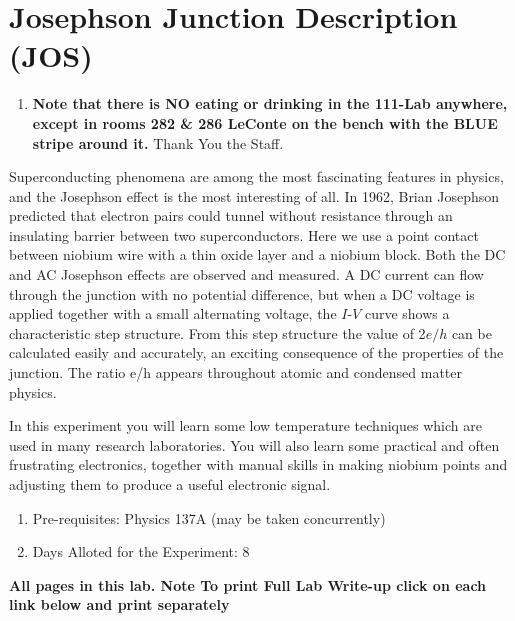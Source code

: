 \documentclass{../lab}
\begin{document}
\maketitle

\tableofcontents

\section{Josephson Junction Description (JOS)}

\begin{enumerate}
    \item \textbf{Note that there is NO eating or drinking in the 111-Lab anywhere, except in rooms 282 \& 286 LeConte on the bench with the BLUE stripe around it.} Thank You the Staff.
\end{enumerate}

Superconducting phenomena are among the most fascinating features in physics, and the Josephson effect is the most interesting of all. In 1962, Brian Josephson predicted that electron pairs could tunnel without resistance through an insulating barrier between two superconductors. Here we use a point contact between niobium wire with a thin oxide layer and a niobium block. Both the DC and AC Josephson effects are observed and measured. A DC current can flow through the junction with no potential difference, but when a DC voltage is applied together with a small alternating voltage, the $I$-$V$ curve shows a characteristic step structure. From this step structure the value of 2$e/h$ can be calculated easily and accurately, an exciting consequence of the properties of the junction. The ratio e/h appears throughout atomic and condensed matter physics.

In this experiment you will learn some low temperature techniques which are used in many research laboratories. You will also learn some practical and often frustrating electronics, together with manual skills in making niobium points and adjusting them to produce a useful electronic signal.

\begin{enumerate}
    \item Pre-requisites: Physics 137A (may be taken concurrently)

    \item Days Alloted for the Experiment: 8
\end{enumerate}

\textbf{All pages in this lab. Note To print Full Lab Write-up click on each link below and print separately }
\end{document}
